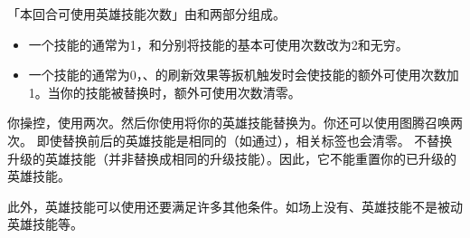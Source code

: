 「本回合可使用英雄技能次数」由和两部分组成。
\begin{itemize}
    \item 一个技能的通常为1，和分别将技能的基本可使用次数改为2和无穷。
    \item 一个技能的通常为0，、的刷新效果等扳机触发时会使技能的额外可使用次数加1。当你的技能被替换时，额外可使用次数清零。
\end{itemize}
\example 你操控，使用两次。然后你使用将你的英雄技能替换为。你还可以使用图腾召唤两次。
\notice 即使替换前后的英雄技能是相同的（如通过），相关标签也会清零。
\notice {}不替换升级的英雄技能（并非替换成相同的升级技能）。因此，它不能重置你的已升级的英雄技能。

此外，英雄技能可以使用还要满足许多其他条件。如场上没有、英雄技能不是被动英雄技能等。